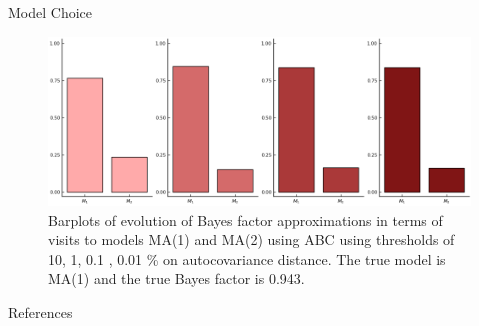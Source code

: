 \documentclass[10pt]{beamer}
\begin{document}
\begin{frame}[fragile]{Model Choice}

    \begin{figure}[H]
        \centering
        \includegraphics[width=11.2cm]{images/ModelChoice_MA1.png}
        \caption{Barplots of evolution of Bayes factor approximations
        in terms of visits to models MA(1) and MA(2) using
        ABC using thresholds of 10, 1, 0.1 , 0.01 \% on autocovariance
        distance. The true model is MA(1) and the true Bayes factor is 0.943.
        }
    \end{figure}

\end{frame}

\begin{frame}[allowframebreaks]{References}

  \renewcommand{\section}[2]{}%
  
  

\end{frame}
\end{document}
